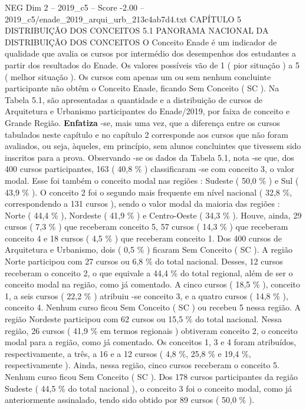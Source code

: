 \begin{textsample}{NEG Dim 2 – 2019\_c5 – Score -2.00 – 2019\_c5/enade\_2019\_arqui\_urb\_213c4ab7d4.txt}  \label{ex:f2_neg_097}
CAPÍTULO 5 DISTRIBUIÇÃO DOS CONCEITOS 5.1 PANORAMA NACIONAL DA DISTRIBUIÇÃO DOS CONCEITOS O Conceito Enade é um indicador de qualidade que avalia os cursos por intermédio dos desempenhos dos estudantes a partir dos resultados do Enade.
Os valores possíveis vão de 1 ( pior situação ) a 5 ( melhor situação ).
Os cursos com apenas um ou sem nenhum concluinte participante não obtêm o Conceito Enade, ficando Sem Conceito ( SC ).
Na Tabela 5.1, são apresentadas a quantidade e a distribuição de cursos de Arquitetura e Urbanismo participantes do Enade/2019, por faixa de conceito e Grande Região. \textbf{Enfatiza} -se, mais uma vez, que a diferença entre os cursos tabulados neste capítulo e no capítulo 2 corresponde aos cursos que não foram avaliados, ou seja, àqueles, em princípio, sem alunos concluintes que tivessem sido inscritos para a prova.
Observando -se os dados da Tabela 5.1, nota -se que, dos 400 cursos participantes, 163 ( 40,8 \% ) classificaram -se com conceito 3, o valor modal.
Esse foi também o conceito modal nas regiões : Sudeste ( 50,0 \% ) e Sul ( 43,9 \% ).
O conceito 2 foi o segundo mais frequente em nível nacional ( 32,8 \%, correspondendo a 131 cursos ), sendo o valor modal da maioria das regiões : Norte ( 44,4 \% ), Nordeste ( 41,9 \% ) e Centro-Oeste ( 34,3 \% ).
Houve, ainda, 29 cursos ( 7,3 \% ) que receberam conceito 5, 57 cursos ( 14,3 \% ) que receberam conceito 4 e 18 cursos ( 4,5 \% ) que receberam conceito 1.
Dos 400 cursos de Arquitetura e Urbanismo, dois ( 0,5 \% ) ficaram Sem Conceito ( SC ).
A região Norte participou com 27 cursos ou 6,8 \% do total nacional.
Desses, 12 cursos receberam o conceito 2, o que equivale a 44,4 \% do total regional, além de ser o conceito modal na região, como já comentado.
A cinco cursos ( 18,5 \% ), conceito 1, a seis cursos ( 22,2 \% ) atribuiu -se conceito 3, e a quatro cursos ( 14,8 \% ), conceito 4.
Nenhum curso ficou Sem Conceito ( SC ) ou recebeu 5 nessa região.
A região Nordeste participou com 62 cursos ou 15,5 \% do total nacional.
Nessa região, 26 cursos ( 41,9 \% em termos regionais ) obtiveram conceito 2, o conceito modal para a região, como já comentado.
Os conceitos 1, 3 e 4 foram atribuídos, respectivamente, a três, a 16 e a 12 cursos ( 4,8 \%, 25,8 \% e 19,4 \%, respectivamente ).
Ainda, nessa região, cinco cursos receberam o conceito 5.
Nenhum curso ficou Sem Conceito ( SC ).
Dos 178 cursos participantes da região Sudeste ( 44,5 \% do total nacional ), o conceito 3 foi o conceito modal, como já anteriormente assinalado, tendo sido obtido por 89 cursos ( 50,0 \% ).

\end{textsample}
